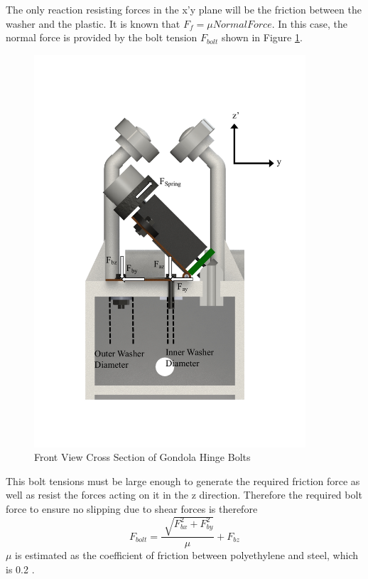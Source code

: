 \documentclass[../main.tex]{subfiles}
\begin{document}
The only reaction resisting forces in the x'y plane will be the friction between the washer and the plastic. It is known that $F_f = \mu Normal Force$. In this case, the normal force is provided by the bolt tension $F_{bolt}$ shown in Figure \ref{fig:boltCrossSection}. 
\begin{figure}[H]
	\centering
	\includegraphics[width=0.9\textwidth]{img/gondola/boltCrossSection.pdf}
	\caption{Front View Cross Section of Gondola Hinge Bolts}
	\label{fig:boltCrossSection}
\end{figure}
This bolt tensions must be large enough to generate the required friction force as well as resist the forces acting on it in the z direction. Therefore the required bolt force to ensure no slipping due to shear forces is therefore
\begin{equation}
F_{bolt} = \dfrac{\sqrt[]{F_{bx}^2 + F_{by}^2}}{\mu} + F_{bz}
\end{equation}
$\mu $ is estimated as the coefficient of friction between polyethylene and steel, which is 0.2 \cite{Friction}. \\
\end{document}
